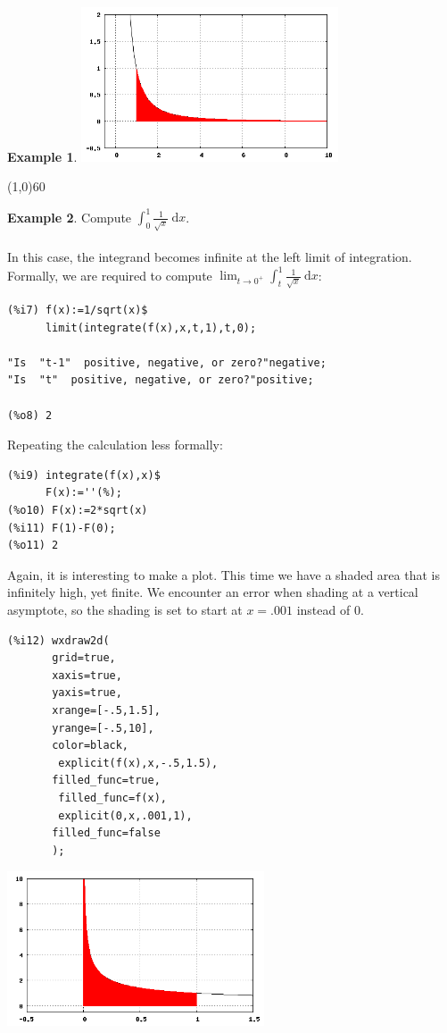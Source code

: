 \documentclass[10.5pt,twoside]{report}
\theoremstyle{definition}
\newtheorem{exmp}{Example}[section]
\begin{document}
\begin{exmp}
\includegraphics[width=3in]{example_1_4_1_1}

\end{exmp}

\line(1,0){60}
\linethickness{0.5mm}


\begin{exmp} Compute $\displaystyle \int_0^1 \frac{1}{\sqrt{x}}\ \mathrm{d}x$.\\
${}$\\

In this case, the integrand becomes infinite at the left limit of integration.  Formally, we are required to compute $\displaystyle \lim_{t \to 0^+} \displaystyle \int_t^1 \frac{1}{\sqrt{x}}\ \mathrm{d}x$:
${}$\\

\begin{verbatim}
(%i7) f(x):=1/sqrt(x)$
      limit(integrate(f(x),x,t,1),t,0);
      
"Is  "t-1"  positive, negative, or zero?"negative;
"Is  "t"  positive, negative, or zero?"positive;

(%o8) 2
\end{verbatim}

Repeating the calculation less formally:

\begin{verbatim}
(%i9) integrate(f(x),x)$
      F(x):=''(%);
(%o10) F(x):=2*sqrt(x)
(%i11) F(1)-F(0);
(%o11) 2
\end{verbatim}


Again, it is interesting to make a plot.  This time we have a shaded area that is infinitely high, yet finite.  We encounter an error when shading at a vertical asymptote, so the shading is set to start at $x=.001$ instead of $0$.

\begin{verbatim}
(%i12) wxdraw2d(
       grid=true,
       xaxis=true,
       yaxis=true,
       xrange=[-.5,1.5],
       yrange=[-.5,10],
       color=black,
        explicit(f(x),x,-.5,1.5),
       filled_func=true,
        filled_func=f(x),
        explicit(0,x,.001,1),
       filled_func=false
       );
\end{verbatim}


\includegraphics[width=3in]{example_1_4_2_1}

\end{exmp}
\end{document}
